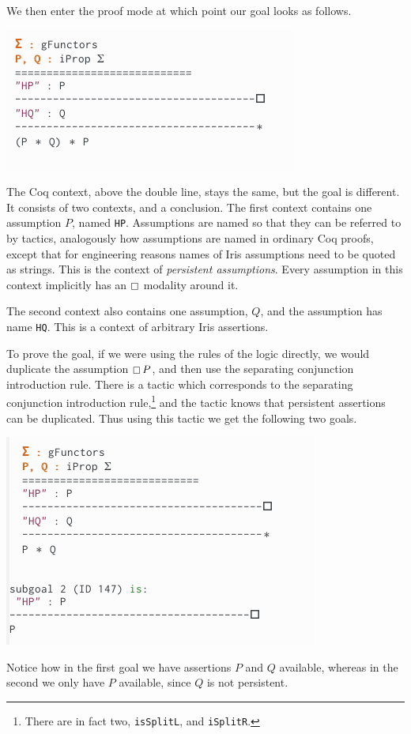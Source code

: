 We then enter the proof mode at which point our goal looks as follows.
\begin{center}
  \includegraphics[scale=0.7]{sections/graphics/proofmode-1.png}
\end{center}
The Coq context, above the double line, stays the same, but the goal is different.
It consists of two contexts, and a conclusion.
The first context contains one assumption $P$, named \texttt{HP}.
Assumptions are named so that they can be referred to by tactics, analogously how assumptions are named in ordinary Coq proofs, except that for engineering reasons names of Iris assumptions need to be quoted as strings.
This is the context of \emph{persistent assumptions}.
Every assumption in this context implicitly has an $\mathop{\boxempty}$ modality around it.

The second context also contains one assumption, $Q$, and the assumption has name \texttt{HQ}.
This is a context of arbitrary Iris assertions.

To prove the goal, if we were using the rules of the logic directly, we would duplicate the assumption $\mathop{\boxempty} P$, and then use the separating conjunction introduction rule.
There is a tactic which corresponds to the separating conjunction introduction rule,\footnote{There are in fact two, \texttt{isSplitL}, and \texttt{iSplitR}.} and the tactic knows that persistent assertions can be duplicated.
Thus using this tactic we get the following two goals.
\begin{center}
  \includegraphics[scale=0.7]{sections/graphics/proofmode-2.png}
\end{center}
Notice how in the first goal we have assertions $P$ and $Q$ available, whereas in the second we only have $P$ available, since $Q$ is not persistent.

